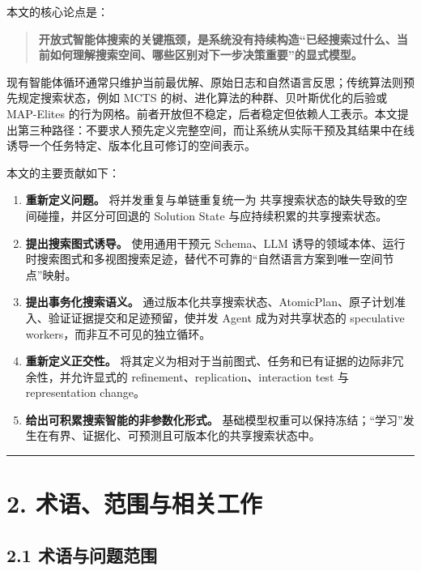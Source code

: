 \documentclass[
  11pt]{ctexart}
\providecommand{\tightlist}{%
  \setlength{\itemsep}{0pt}\setlength{\parskip}{0pt}}
\begin{document}
本文的核心论点是：

\begin{quote}
\textbf{开放式智能体搜索的关键瓶颈，是系统没有持续构造``已经搜索过什么、当前如何理解搜索空间、哪些区别对下一步决策重要''的显式模型。}
\end{quote}

现有智能体循环通常只维护当前最优解、原始日志和自然语言反思；传统算法则预先规定搜索状态，例如
MCTS 的树、进化算法的种群、贝叶斯优化的后验或 MAP-Elites
的行为网格。前者开放但不稳定，后者稳定但依赖人工表示。本文提出第三种路径：不要求人预先定义完整空间，而让系统从实际干预及其结果中在线诱导一个任务特定、版本化且可修订的空间表示。

本文的主要贡献如下：

\begin{enumerate}
\def\labelenumi{\arabic{enumi}.}
\tightlist
\item
  \textbf{重新定义问题。} 将并发重复与单链重复统一为
  共享搜索状态的缺失导致的空间碰撞，并区分可回退的 Solution State
  与应持续积累的共享搜索状态。
\item
  \textbf{提出搜索图式诱导。} 使用通用干预元 Schema、LLM
  诱导的领域本体、运行时搜索图式和多视图搜索足迹，替代不可靠的``自然语言方案到唯一空间节点''映射。
\item
  \textbf{提出事务化搜索语义。}
  通过版本化共享搜索状态、AtomicPlan、原子计划准入、验证证据提交和足迹预留，使并发
  Agent 成为对共享状态的 speculative workers，而非互不可见的独立循环。
\item
  \textbf{重新定义正交性。}
  将其定义为相对于当前图式、任务和已有证据的边际非冗余性，并允许显式的
  refinement、replication、interaction test 与 representation change。
\item
  \textbf{给出可积累搜索智能的非参数化形式。}
  基础模型权重可以保持冻结；``学习''发生在有界、证据化、可预测且可版本化的共享搜索状态中。
\end{enumerate}

\begin{center}\rule{0.5\linewidth}{0.5pt}\end{center}

\section{2.
术语、范围与相关工作}\label{ux672fux8bedux8303ux56f4ux4e0eux76f8ux5173ux5de5ux4f5c}

\subsection{2.1
术语与问题范围}\label{ux672fux8bedux4e0eux95eeux9898ux8303ux56f4}
\end{document}

